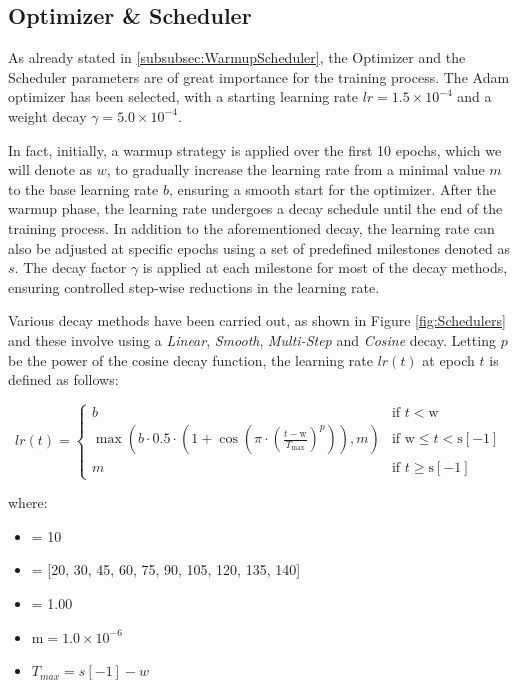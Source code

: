 \subsection{Optimizer \& Scheduler}
As already stated in \ref{subsubsec:WarmupScheduler}, the Optimizer and the Scheduler parameters are of great importance for the training process. The Adam optimizer has been selected, with a starting learning rate $lr = 1.5 \times 10^{-4}$ and a weight decay $\gamma = 5.0 \times 10^{-4}$.

In fact, initially, a warmup strategy is applied over the first 10 epochs, which we will denote as $w$, to gradually increase the learning rate from a minimal value $m$ to the base learning rate $b$, ensuring a smooth start for the optimizer. After the warmup phase, the learning rate undergoes a decay schedule until the end of the training process. In addition to the aforementioned decay, the learning rate can also be adjusted at specific epochs using a set of predefined milestones denoted as $s$. The decay factor $\gamma$ is applied at each milestone for most of the decay methods, ensuring controlled step-wise reductions in the learning rate.

Various decay methods have been carried out, as shown in Figure \ref{fig:Schedulers} and these involve using a \textit{Linear}, \textit{Smooth}, \textit{Multi-Step} and \textit{Cosine} decay. Letting $p$ be the power of the cosine decay function, the learning rate $lr(t)$ at epoch $t$ is defined as follows:

\[
    lr(t) = 
    \begin{cases} 
        b & \text{if } t < \text{w} \\
        \max \left( b \cdot 0.5 \cdot \left( 1 + \cos \left( \pi \cdot \left( \frac{t - \text{w}}{T_{\max}} \right)^{p} \right) \right), m \right) & \text{if } \text{w} \leq t < \text{s}[-1] \\
        m & \text{if } t \geq \text{s}[-1]
    \end{cases}
\]

where:
\begin{itemize}
    \item {} = 10
    \item {} = [20, 30, 45, 60, 75, 90, 105, 120, 135, 140]
    \item {} = 1.00
    \item $\text{m} = 1.0 \times 10^{-6}$
    \item $T_{max} = s[-1] - w$
\end{itemize}

